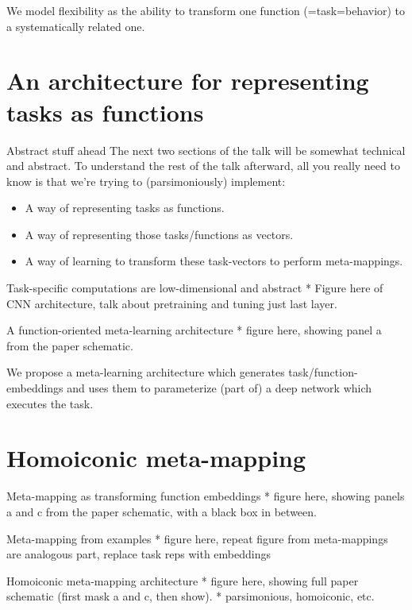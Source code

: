 \documentclass{beamer}
\begin{document}
\begin{frame}[standout]
We model flexibility as the ability to transform one function (=task=behavior) to a systematically related one.
\end{frame}

\section{An architecture for representing tasks as functions}

\begin{frame}{Abstract stuff ahead}
The next two sections of the talk will be somewhat technical and abstract. To understand the rest of the talk afterward, all you really need to know is that we're trying to (parsimoniously) implement:
\begin{itemize}
\item A way of representing tasks as functions.
\item A way of representing those tasks/functions as vectors.
\item A way of learning to transform these task-vectors to perform meta-mappings.
\end{itemize}
\end{frame}

\begin{frame}{Task-specific computations are low-dimensional and abstract}
* Figure here of CNN architecture, talk about pretraining and tuning just last layer.
\end{frame}

\begin{frame}{A function-oriented meta-learning architecture}
* figure here, showing panel a from the paper schematic.
\end{frame}

\begin{frame}[standout]
We propose a meta-learning architecture which generates task/function-embeddings and uses them to parameterize (part of) a deep network which executes the task. %
\end{frame}

\section{Homoiconic meta-mapping}

\begin{frame}{Meta-mapping as transforming function embeddings}
* figure here, showing panels a and c from the paper schematic, with a black box in between.
\end{frame}

\begin{frame}{Meta-mapping from examples}
* figure here, repeat figure from meta-mappings are analogous part, replace task reps with embeddings 
\end{frame}

\begin{frame}{Homoiconic meta-mapping architecture}
* figure here, showing full paper schematic (first mask a and c, then show). 
* parsimonious, homoiconic, etc.
\end{frame}
\end{document}
